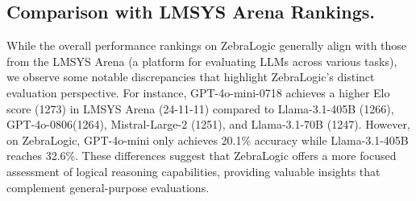 \begin{comment}
    GPT4o's reasoning for the example puzzle in Fig1 
    {
    "reasoning": "Based on Clues 1, 2, and 6, we placed Eric, who drinks milk, in House 3. Since Arnold is not in the first house (Clue 1) and drinks water (Clue 5), he must be in House 2. The person in House 2 loves cooking (Clue 4), which aligns with Arnold’s position. By elimination, Peter is in House 1, with tea as his drink and gardening as his hobby. The photography enthusiast is also in House 2, as per Clue 3, matching Arnold’s profile.",
    "solution": {
        "House 1": {
            "Name": "Peter",
            "Drink": "tea",
            "Hobby": "gardening"
        },
        "House 2": {
            "Name": "Arnold",
            "Drink": "water",
            "Hobby": "cooking"
        },
        "House 3": {
            "Name": "Eric",
            "Drink": "milk",
            "Hobby": "photography"
        }
    }
}
\end{comment}


\subsection{Comparison with LMSYS Arena Rankings.}
While the overall performance rankings on ZebraLogic generally align with those from the LMSYS Arena (a platform for evaluating LLMs across various tasks), we observe some notable discrepancies that highlight ZebraLogic's distinct evaluation perspective. For instance, GPT-4o-mini-0718 achieves a higher Elo score (1273) in LMSYS Arena (24-11-11) compared to Llama-3.1-405B (1266), GPT-4o-0806(1264), Mistral-Large-2 (1251), and Llama-3.1-70B (1247). However, on ZebraLogic, GPT-4o-mini only achieves 20.1\% accuracy while Llama-3.1-405B reaches 32.6\%. These differences suggest that ZebraLogic offers a more focused assessment of logical reasoning capabilities, providing valuable insights that complement general-purpose evaluations.





    
